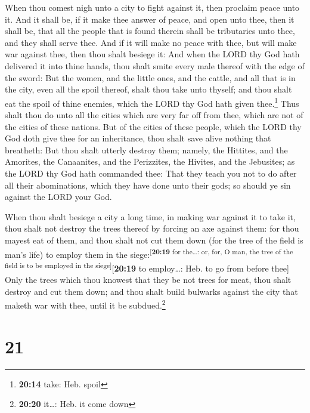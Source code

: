  When thou comest nigh unto a city to fight against it,
then proclaim peace unto it.  And it shall be, if it make
thee answer of peace, and open unto thee, then it shall be, that all the
people that is found therein shall be tributaries unto thee, and they
shall serve thee.  And if it will make no peace with
thee, but will make war against thee, then thou shalt besiege it:
 And when the LORD thy God hath delivered it into thine
hands, thou shalt smite every male thereof with the edge of the sword:
 But the women, and the little ones, and the cattle, and
all that is in the city, even all the spoil thereof, shalt thou take
unto thyself; and thou shalt eat the spoil of thine enemies, which the
LORD thy God hath given thee.\footnote{\textbf{20:14} take: Heb. spoil}
 Thus shalt thou do unto all the cities which are very
far off from thee, which are not of the cities of these nations.
 But of the cities of these people, which the LORD thy
God doth give thee for an inheritance, thou shalt save alive nothing
that breatheth:  But thou shalt utterly destroy them;
namely, the Hittites, and the Amorites, the Canaanites, and the
Perizzites, the Hivites, and the Jebusites; as the LORD thy God hath
commanded thee:  That they teach you not to do after all
their abominations, which they have done unto their gods; so should ye
sin against the LORD your God.

 When thou shalt besiege a city a long time, in making
war against it to take it, thou shalt not destroy the trees thereof by
forcing an axe against them: for thou mayest eat of them, and thou shalt
not cut them down (for the tree of the field is man's life) to employ
them in the siege:\textsuperscript{{[}\textbf{20:19} for the\ldots: or,
for, O man, the tree of the field is to be employed in the
siege{]}}{[}\textbf{20:19} to employ\ldots: Heb. to go from before
thee{]}  Only the trees which thou knowest that they be
not trees for meat, thou shalt destroy and cut them down; and thou shalt
build bulwarks against the city that maketh war with thee, until it be
subdued.\footnote{\textbf{20:20} it\ldots: Heb. it come down}

\hypertarget{section-20}{%
\section{21}\label{section-20}}

